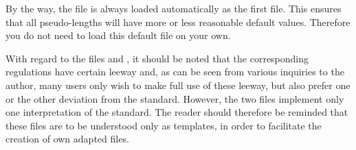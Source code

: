 By the way, the   file is always loaded
automatically as the first  file. This ensures that all
pseudo-lengths will have more or less reasonable default values. Therefore you
do not need to load this default file on your own.

With regard to the  files  and , it
should be noted that the corresponding regulations have certain leeway and, as
can be seen from various inquiries to the author, many users only wish to make
full use of these leeway, but also prefer one or the other deviation from the
standard. However, the two files implement only one interpretation of the
standard. The reader should therefore be reminded that these files are to be
understood only as templates, in order to facilitate the creation of own
adapted  files.%
%
